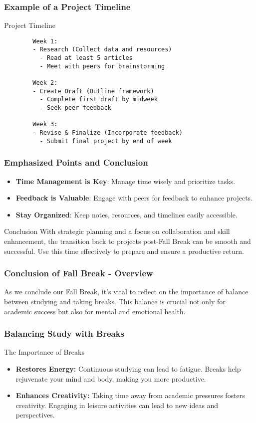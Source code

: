 \documentclass[aspectratio=169]{beamer}
\begin{document}
\begin{frame}[fragile]
    \frametitle{Example of a Project Timeline}
    \begin{block}{Project Timeline}
        \begin{verbatim}
        Week 1:
        - Research (Collect data and resources)
          - Read at least 5 articles
          - Meet with peers for brainstorming

        Week 2:
        - Create Draft (Outline framework)
          - Complete first draft by midweek
          - Seek peer feedback

        Week 3:
        - Revise & Finalize (Incorporate feedback)
          - Submit final project by end of week
        \end{verbatim}
    \end{block}
\end{frame}

\begin{frame}[fragile]
    \frametitle{Emphasized Points and Conclusion}
    \begin{itemize}
        \item \textbf{Time Management is Key}: Manage time wisely and prioritize tasks.
        \item \textbf{Feedback is Valuable}: Engage with peers for feedback to enhance projects.
        \item \textbf{Stay Organized}: Keep notes, resources, and timelines easily accessible.
    \end{itemize}
    
    \begin{block}{Conclusion}
        With strategic planning and a focus on collaboration and skill enhancement, the transition back to projects post-Fall Break can be smooth and successful. Use this time effectively to prepare and ensure a productive return.
    \end{block}
\end{frame}

\begin{frame}[fragile]
    \frametitle{Conclusion of Fall Break - Overview}
    As we conclude our Fall Break, it’s vital to reflect on the importance of balance between studying and taking breaks. This balance is crucial not only for academic success but also for mental and emotional health.
\end{frame}

\begin{frame}[fragile]
    \frametitle{Balancing Study with Breaks}
    \begin{block}{The Importance of Breaks}
        \begin{itemize}
            \item \textbf{Restores Energy:} Continuous studying can lead to fatigue. Breaks help rejuvenate your mind and body, making you more productive.
            \item \textbf{Enhances Creativity:} Taking time away from academic pressures fosters creativity. Engaging in leisure activities can lead to new ideas and perspectives.
        \end{itemize}
    \end{block}
\end{frame}
\end{document}
